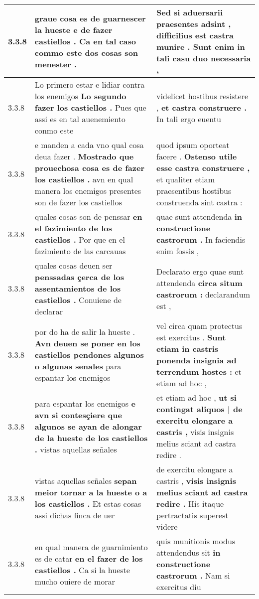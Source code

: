 \begin{tabular}{|p{1cm}|p{6.5cm}|p{6.5cm}|}
3.3.8 & graue cosa es de guarnescer la hueste \textbf{ e de fazer castiellos . } Ca en tal caso commo este dos cosas son menester . & Sed si aduersarii praesentes adsint , \textbf{ difficilius est castra munire . } Sunt enim in tali casu duo necessaria , \\\hline
3.3.8 & Lo primero estar e lidiar contra los enemigos \textbf{ Lo segundo fazer los castiellos . } Pues que assi es en tal auenemiento conmo este & videlicet hostibus resistere , \textbf{ et castra construere . } In tali ergo euentu \\\hline
3.3.8 & e manden a cada vno qual cosa deua fazer . \textbf{ Mostrado que prouechosa cosa es de fazer los castiellos . } avn en qual manera los enemigos presentes son de fazer los castiellos & quod ipsum oporteat facere . \textbf{ Ostenso utile esse castra construere , } et qualiter etiam praesentibus hostibus construenda sint castra : \\\hline
3.3.8 & quales cosas son de penssar \textbf{ en el fazimiento de los castiellos . } Por que en el fazimiento de las carcauas & quae sunt attendenda \textbf{ in constructione castrorum . } In faciendis enim fossis , \\\hline
3.3.8 & quales cosas deuen ser \textbf{ penssadas çerca de los assentamientos de los castiellos . } Conuiene de declarar & Declarato ergo quae sunt attendenda \textbf{ circa situm castrorum : } declarandum est , \\\hline
3.3.8 & por do ha de salir la hueste . \textbf{ Avn deuen se poner en los castiellos pendones algunos o algunas senales } para espantar los enemigos & vel circa quam protectus est exercitus . \textbf{ Sunt etiam in castris ponenda insignia ad terrendum hostes : } et etiam ad hoc , \\\hline
3.3.8 & para espantar los enemigos \textbf{ e avn si contesçiere que algunos se ayan de alongar de la hueste de los castiellos . } vistas aquellas señales & et etiam ad hoc , \textbf{ ut si contingat aliquos | de exercitu elongare a castris , } visis insignis melius sciant ad castra redire . \\\hline
3.3.8 & vistas aquellas señales \textbf{ sepan meior tornar a la hueste o a los castiellos . } Et estas cosas assi dichas finca de uer & de exercitu elongare a castris , \textbf{ visis insignis melius sciant ad castra redire . } His itaque pertractatis superest videre \\\hline
3.3.8 & en qual manera de guarnimiento es de catar \textbf{ en el fazer de los castiellos . } Ca si la hueste mucho ouiere de morar & quis munitionis modus attendendus sit \textbf{ in constructione castrorum . } Nam si exercitus diu \\\hline

\end{tabular}
